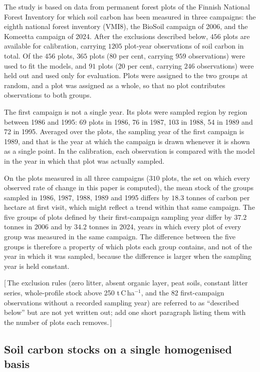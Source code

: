\documentclass[11pt]{article}
\newcommand{\gap}[1]{\textcolor{red!70!black}{\small[\,#1\,]}}
\begin{document}
The study is based on data from permanent forest plots of the Finnish National Forest
Inventory for which soil carbon has been measured in three campaigns: the eighth national
forest inventory (VMI8), the BioSoil campaign of 2006, and the Komeetta campaign of 2024.
After the exclusions described below, $456$ plots are available for calibration, carrying
$1205$ plot-year observations of soil carbon in total. Of the $456$ plots, $365$ plots
($80$ per cent, carrying $959$ observations) were used to fit the models, and $91$ plots
($20$ per cent, carrying $246$ observations) were held out and used only for evaluation.
Plots were assigned to the two groups at random, and a plot was assigned as a whole, so
that no plot contributes observations to both groups.

The first campaign is not a single year. Its plots were sampled region by region between
1986 and 1995: 69 plots in 1986, 76 in 1987, 103 in 1988, 54 in 1989 and 72 in 1995.
Averaged over the plots, the sampling year of the first campaign is 1989, and that is the
year at which the campaign is drawn whenever it is shown as a single point. In the
calibration, each observation is compared with the model in the year in which that plot
was actually sampled.

On the plots measured in all three campaigns ($310$ plots, the set on which every observed
rate of change in this paper is computed), the mean stock of the groups sampled in 1986,
1987, 1988, 1989 and 1995 differs by $18.3$ tonnes of carbon per hectare at first visit,
which might reflect a trend within that same campaign. The five groups of plots defined by
their first-campaign sampling year differ by $37.2$ tonnes in 2006 and by $34.2$ tonnes in
2024, years in which every plot of every group was measured in the same campaign. The
difference between the five groups is therefore a property of which plots each group
contains, and not of the year in which it was sampled, because the difference is larger
when the sampling year is held constant.

\gap{The exclusion rules (zero litter, absent organic layer, peat soils, constant litter
series, whole-profile stock above 250 t\,C\,ha$^{-1}$, and the 82 first-campaign observations
without a recorded sampling year) are referred to as ``described below''
but are not yet written out; add one short paragraph listing them with the number of plots
each removes.}

\subsection{Soil carbon stocks on a single homogenised basis}\label{sec:soc}
\end{document}
